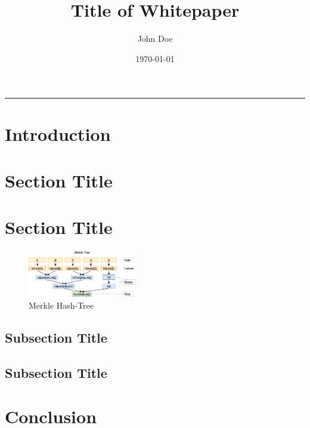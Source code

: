 \documentclass[twocolumn]{article}
\title{\Large Title of Whitepaper \\
[10pt]
}
\date{\today}
\author{John Doe}
\makeatletter
\renewenvironment{abstract}
 {\small
  \begin{center}
  \bfseries \abstractname\vspace{-.5em}\vspace{0pt}
  \end{center}
  \list{}{
    \setlength{\leftmargin}{0mm}
    \setlength{\rightmargin}{\leftmargin}
  }
  \item\relax}
 {\endlist}
\renewcommand{\maketitle}{\bgroup\setlength{\parindent}{0pt}
\begin{flushleft}
  \textbf{\@title}
  \@author \\ 
  \@date
\end{flushleft}\egroup
}
\makeatother
\begin{document}
\twocolumn[\maketitle]

\begin{abstract}
    \lipsum[1]
\end{abstract}

\rule{\linewidth}{0.5pt}

\section{Introduction}
\lipsum[2]

\section{Section Title}
\lipsum[1-2]

\section{Section Title}

\lipsum[1]

\begin{figure}[H]
    \centering
    \includegraphics[width=0.425\textwidth]{merkle_tree.png}
    \caption{Merkle Hash-Tree \cite{merkle_hash_tree_graphic}}
\end{figure}

\lipsum[2]

\subsection{Subsection Title}

\lipsum[1]

\subsection{Subsection Title}

\lipsum[1]

\section{Conclusion}

\lipsum [4-5]

\begin{thebibliography}{}
\end{thebibliography}
\end{document}
